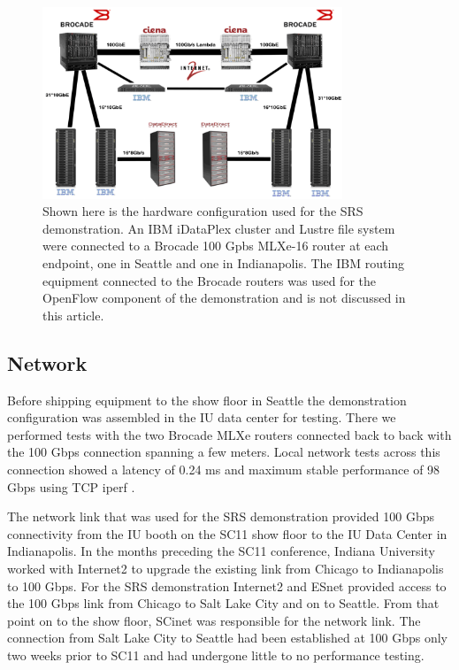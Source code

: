 \documentclass[]{sigplan-proc}
\begin{document}
\begin{figure}[t]
\begin{center}
\includegraphics[width=0.80\textwidth]{figures/hardware.png}
\caption{Shown here is the hardware configuration used for the SRS demonstration. An IBM iDataPlex cluster and
  Lustre file system were connected to a Brocade 100 Gpbs MLXe-16 router at each endpoint, one in Seattle and
  one in Indianapolis. The IBM routing equipment connected to the Brocade routers was used for the OpenFlow component of the demonstration and is not discussed in this article. }
\label{fig:hardwaresetup}
\end{center}
\end{figure}

\subsection{Network}\label{sec:network}

Before shipping equipment to the show floor in Seattle the demonstration configuration was assembled in the IU
data center for testing.  There we performed tests with the two Brocade MLXe routers connected back to back
with the 100 Gbps connection spanning a few meters.  Local network tests across this connection showed a
latency of 0.24 ms and maximum stable performance of 98 Gbps using TCP iperf \cite{iperf2012}.

The network link that was used for the SRS demonstration provided 100 Gbps connectivity from the IU booth on
the SC11 show floor to the IU Data Center in Indianapolis. In the months preceding the SC11 conference,
Indiana University worked with Internet2 to upgrade the existing link from Chicago to Indianapolis to 100
Gbps. For the SRS demonstration Internet2 and ESnet provided access to the 100 Gbps link from Chicago to Salt
Lake City and on to Seattle. From that point on to the show floor, SCinet was responsible for the network
link. The connection from Salt Lake City to Seattle had been established at 100 Gbps only two weeks prior to
SC11 and had undergone little to no performance testing.
\end{document}
